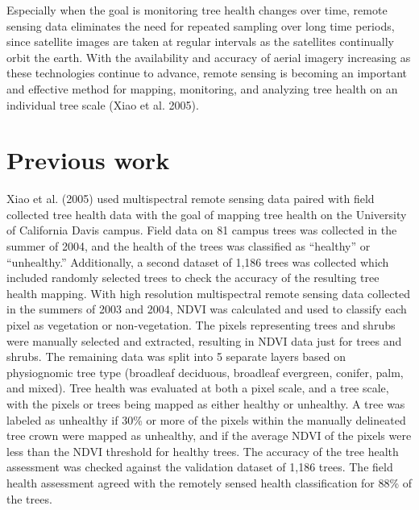 \documentclass[12pt,twoside]{reedthesis}
\begin{document}
Especially when the goal is monitoring tree health changes over time,
remote sensing data eliminates the need for repeated sampling over long
time periods, since satellite images are taken at regular intervals as
the satellites continually orbit the earth. With the availability and
accuracy of aerial imagery increasing as these technologies continue to
advance, remote sensing is becoming an important and effective method
for mapping, monitoring, and analyzing tree health on an individual tree
scale (Xiao et al. 2005).

\hypertarget{previous-work}{%
\section{Previous work}\label{previous-work}}

Xiao et al. (2005) used multispectral remote sensing data paired with field
collected tree health data with the goal of mapping tree health on the
University of California Davis campus. Field data on 81 campus trees was
collected in the summer of 2004, and the health of the trees was
classified as ``healthy'' or ``unhealthy.'' Additionally, a second dataset
of 1,186 trees was collected which included randomly selected trees to
check the accuracy of the resulting tree health mapping. With high
resolution multispectral remote sensing data collected in the summers of
2003 and 2004, NDVI was calculated and used to classify each pixel as
vegetation or non-vegetation. The pixels representing trees and shrubs
were manually selected and extracted, resulting in NDVI data just for
trees and shrubs. The remaining data was split into 5 separate layers
based on physiognomic tree type (broadleaf deciduous, broadleaf
evergreen, conifer, palm, and mixed). Tree health was evaluated at both
a pixel scale, and a tree scale, with the pixels or trees being mapped
as either healthy or unhealthy. A tree was labeled as unhealthy if 30\%
or more of the pixels within the manually delineated tree crown were
mapped as unhealthy, and if the average NDVI of the pixels were less
than the NDVI threshold for healthy trees. The accuracy of the tree
health assessment was checked against the validation dataset of 1,186
trees. The field health assessment agreed with the remotely sensed
health classification for 88\% of the trees.
\end{document}
